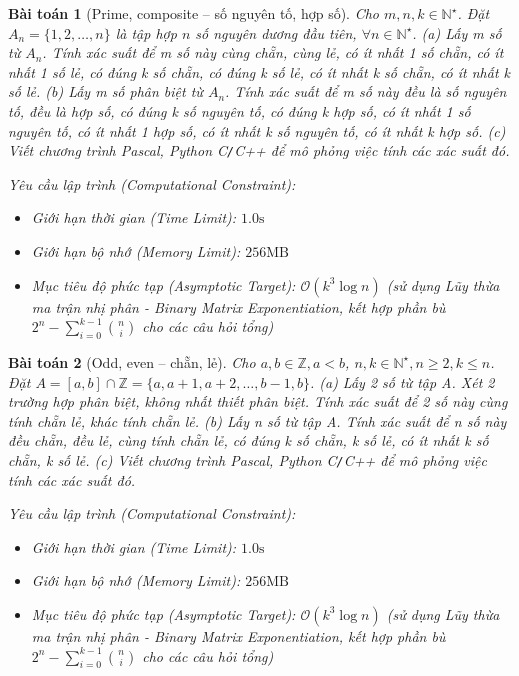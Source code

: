 \documentclass{article}
\newtheorem{baitoan}{Bài toán}
\begin{document}
\begin{baitoan}[Prime, composite -- số nguyên tố, hợp số]
	Cho $m,n,k\in\mathbb{N}^\star$. Đặt $A_n = \{1,2,\ldots,n\}$ là tập hợp $n$ số nguyên dương đầu tiên, $\forall n\in\mathbb{N}^\star$. (a) Lấy m số từ $A_n$. Tính xác suất để m số này cùng chẵn, cùng lẻ, có ít nhất 1 số chẵn, có ít nhất 1 số lẻ, có đúng k số chẵn, có đúng k số lẻ, có ít nhất k số chẵn, có ít nhất k số lẻ. (b) Lấy m số phân biệt từ $A_n$. Tính xác suất để m số này đều là số nguyên tố, đều là hợp số, có đúng k số nguyên tố, có đúng k hợp số, có ít nhất 1 số nguyên tố, có ít nhất 1 hợp số, có ít nhất k số nguyên tố, có ít nhất k hợp số. (c) Viết chương trình {\sf Pascal, Python C{\tt/}C++} để mô phỏng việc tính các xác suất đó.

    \vspace{0.5em}
    \emph{Yêu cầu lập trình (Computational Constraint):}
    \begin{itemize}
        \item Giới hạn thời gian (Time Limit): $1.0\mathrm{s}$
        \item Giới hạn bộ nhớ (Memory Limit): $256\mathrm{MB}$
        \item Mục tiêu độ phức tạp (Asymptotic Target): $\mathcal{O}(k^3 \log n)$ (sử dụng Lũy thừa ma trận nhị phân - Binary Matrix Exponentiation, kết hợp phần bù $2^n - \sum_{i=0}^{k-1} \binom{n}{i}$ cho các câu hỏi tổng)
    \end{itemize}
\end{baitoan}


\begin{baitoan}[Odd, even -- chẵn, lẻ]
	Cho $a,b\in\mathbb{Z},a < b$, $n,k\in\mathbb{N}^\star,n\ge2,k\le n$. Đặt $A = [a,b]\cap\mathbb{Z} = \{a,a + 1,a + 2,\ldots,b - 1,b\}$. (a) Lấy 2 số từ tập A. Xét 2 trường hợp phân biệt, không nhất thiết phân biệt. Tính xác suất để 2 số này cùng tính chẵn lẻ, khác tính chẵn lẻ. (b) Lấy n số từ tập A. Tính xác suất để n số này đều chẵn, đều lẻ, cùng tính chẵn lẻ, có đúng k số chẵn, k số lẻ, có ít nhất k số chẵn, k số lẻ. (c) Viết chương trình {\sf Pascal, Python C{\tt/}C++} để mô phỏng việc tính các xác suất đó.

    \vspace{0.5em}
    \emph{Yêu cầu lập trình (Computational Constraint):}
    \begin{itemize}
        \item Giới hạn thời gian (Time Limit): $1.0\mathrm{s}$
        \item Giới hạn bộ nhớ (Memory Limit): $256\mathrm{MB}$
        \item Mục tiêu độ phức tạp (Asymptotic Target): $\mathcal{O}(k^3 \log n)$ (sử dụng Lũy thừa ma trận nhị phân - Binary Matrix Exponentiation, kết hợp phần bù $2^n - \sum_{i=0}^{k-1} \binom{n}{i}$ cho các câu hỏi tổng)
    \end{itemize}
\end{baitoan}
\end{document}
